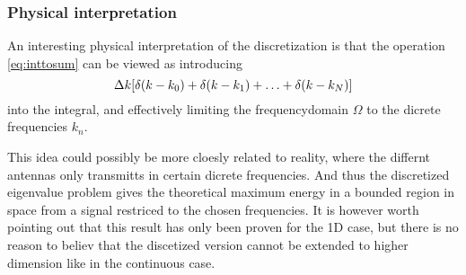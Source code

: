 \documentclass[11pt,a4paper, 
swedish,english %
]{article}
\begin{document}
\subsubsection{Physical interpretation}
An interesting physical interpretation of the discretization is that
the operation \eqref{eq:inttosum} can be viewed as introducing
\begin{equation}
\Delta{k}\qty[\delta(k-k_0) + \delta(k-k_1) +\ldots+\delta(k-k_N)]
\end{equation}
into the integral, and effectively limiting the frequencydomain
$\Omega$ to the dicrete frequencies $k_n$. 

This idea could possibly be more cloesly related to reality, where the
differnt antennas only transmitts in certain dicrete frequencies. And
thus the discretized eigenvalue problem gives the theoretical maximum
energy in a bounded region in space from a signal restriced to the
chosen frequencies. 
It is however worth pointing out that this result has only been proven
for the 1D case\cite{PSWF-V_1978}, but there is no reason to believ
that the discetized version cannot be extended to higher dimension
like in the continuous case. 










\clearpage %
\appendix  %


\end{document}
